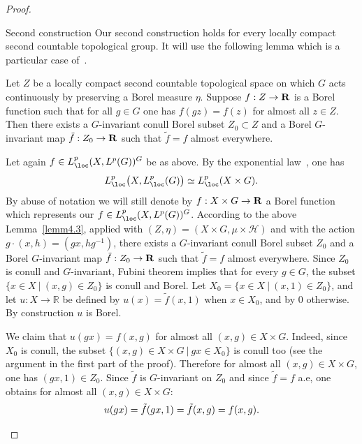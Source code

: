 \begin{proof}
\begin{step}{Second construction}
Our second construction holds for every locally compact second countable topological group. It will use the following lemma which is a particular case of~\cite[Appendices, Proposition~B.5 p.~198]{Z}.

\begin{lemm}\label{lemm4.3}
Let $Z$ be a locally compact second countable topological space on which $G$ acts continuously by preserving a Borel measure $\eta$.
Suppose $f : Z \to \bf R$ is a Borel function such that for all $g \in G$ one has $f(gz) = f(z)$ for almost all $z \in Z$. Then there exists a $G$-invariant conull Borel subset $Z_0 \subset Z$ and a Borel $G$-invariant map $\tilde f : Z_0 \to \bf R$ such that $\tilde f = f$ almost everywhere.
\end{lemm}

Let again $f \in L_{\loc} ^p (X, L^p(G))^G$ be as above. By the exponential law~\cite[Lemma~1.4]{Bl}, one has
\[
L_{\loc} ^p \bigl(X, L_{\loc} ^p(G)\bigr) \simeq L_{\loc} ^p (X \times G).
\]
By abuse of notation we will still denote by $f : X \times G \to \bf R$ a Borel function which represents our $f \in L_{\loc} ^p (X, L^p(G))^G$. According to the above Lemma~\ref{lemm4.3}, applied with $(Z, \eta) = (X \times G, \mu \times \mathcal H)$ and with the action $g \cdot (x,h) = (gx, h g^{-1})$, there exists a $G$-invariant conull Borel subset $Z_0$ and a Borel $G$-invariant map $\tilde f : Z_0 \to \bf R$ such that $\tilde f = f$ almost everywhere. Since $Z_0$ is conull and $G$-invariant, Fubini theorem implies that for every $g \in G$, the subset $\{x \in X~\vert~(x,g) \in Z_0\}$ is conull and Borel. Let $X_0 = \{x \in X~\vert~(x,1) \in Z_0\}$, and let $u : X \to \mathbb R$ be defined by $u(x) = \tilde f(x,1)$ when $x \in X_0$, and by $0$ otherwise. By construction $u$ is Borel.

We claim that $u(gx) = f(x,g)$ for almost all $(x,g) \in X \times G$. Indeed, since $X_0$ is conull, the subset $\{(x,g) \in X \times G~\vert~gx \in X_0 \}$ is conull too (see the argument in the first part of the proof). Therefore for almost all $(x,g) \in X \times G$, one has $(gx, 1) \in Z_0$. Since $\tilde f$ is $G$-invariant on $Z_0$ and since $\tilde f = f$ a.e, one obtains for almost all $(x,g) \in X \times G$:
\[
u(gx) = \tilde f(gx, 1) = \tilde f(x,g) = f(x,g).\qedhere
\]
\end{step}\let\qed\relax
\end{proof}



